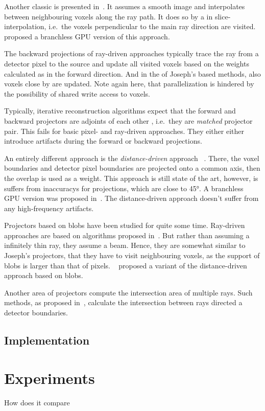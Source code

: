 Another classic is presented in~\cite{joseph_improved_1982}. It assumes a smooth image and
interpolates between neighbouring voxels along the ray path. It does so by a in slice-interpolation,
i.e.\ the voxels perpendicular to the main ray direction are visited.~\cite{graetz_high_2020}
proposed a branchless GPU version of this approach.

The backward projections of ray-driven approaches typically trace the ray from a detector pixel to
the source and update all visited voxels based on the weights calculated as in the forward
direction. And in the of Joseph's based methods, also voxels close by are updated. Note again here,
that parallelization is hindered by the possibility of shared write access to voxels.

Typically, iterative reconstruction algorithms expect that the forward and backward projectors are
adjoints of each other , i.e.\ they are
\textit{matched} projector pair. This fails for basic pixel- and ray-driven approaches.
They either either introduce artifacts during the forward or backward projections.

An entirely different approach is the \textit{distance-driven} approach
~\cite{de_man_distance-driven_2002, de_man_distance-driven_2004}. There, the voxel boundaries and
detector pixel boundaries are projected onto a common axis, then the overlap is used as a weight.
This approach is still state of the art, however, is suffers from inaccuracys for projections, which
are close to 45°. A branchless GPU version was proposed in~\cite{liu_gpu-based_2017}. The
distance-driven approach doesn't suffer from any high-frequency artifacts.

Projectors based on blobs have been studied for quite some time. Ray-driven approaches are based on
algorithms proposed in~\cite{matej_practical_1996, popescu_ray_2004}. But rather than assuming a
infinitely thin ray, they assume a beam. Hence, they are somewhat similar to Joseph's projectors,
that they have to visit neighbouring voxels, as the support of blobs is larger than that of pixels.
~\cite{levakhina_distance-driven_2010} proposed a variant of the distance-driven approach based on
blobs.

Another area of projectors compute the intersection area of multiple rays. Such methods, as proposed
in~\cite{ha_study_2015, ha_efficient_2016, ha_look-up_2018}, calculate the intersection between rays
directed a detector boundaries.

\section{Implementation}


\chapter{Experiments}

How does it compare
